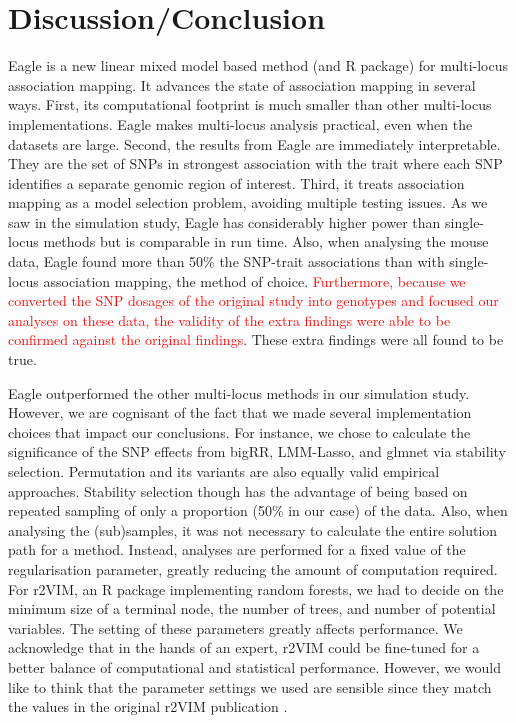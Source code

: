 \documentclass{bioinfo}
\begin{document}
 
\section{Discussion/Conclusion}
Eagle is a new linear mixed model based method (and R package) for multi-locus association mapping. It advances the state of association mapping in several ways. 
First, its computational footprint is much smaller than other multi-locus implementations. Eagle makes multi-locus analysis 
practical, even when the datasets are large. Second, the results from
 Eagle are immediately interpretable. They are the set of SNPs in strongest association with the trait where 
each SNP identifies a separate genomic region of interest. Third, it treats association mapping as a model selection problem, avoiding 
 multiple testing issues. 
 As we saw in the simulation study, Eagle has considerably higher power than single-locus methods but is comparable in run time.
Also, when analysing the mouse data, Eagle found more than 50\% the SNP-trait associations than 
with single-locus association mapping, the method of choice. \textcolor{red}{Furthermore, because we converted the SNP dosages of the 
original study into genotypes and focused our analyses on these data, the validity of the extra findings were able to  be confirmed 
against the original findings}. These extra findings were all found to be true. 

Eagle outperformed the other multi-locus methods in our simulation study. However, we are cognisant of the fact  that we made several implementation 
choices that impact our conclusions.  For instance, we chose to calculate the significance of the 
SNP effects from bigRR, LMM-Lasso, and glmnet via stability selection.  Permutation and its variants \citep{ browning2008presto,pahl2010permory} are also equally valid empirical approaches. Stability selection though has the advantage of being based on repeated sampling of only a proportion (50\% in our case) of the 
data. Also, when analysing the (sub)samples, it was not necessary to calculate the entire solution path for a method. 
 Instead,  analyses are 
performed for a fixed value of the regularisation parameter, greatly reducing the amount of computation required. For r2VIM, an R package 
implementing random forests, we had to decide on the  minimum size of a terminal node, the number of trees, and number of potential variables. 
The setting of these parameters greatly affects performance.  We  acknowledge that in the hands of an expert, 
r2VIM could be fine-tuned for a better balance of computational and statistical performance. 
However, we would like to think that the parameter settings we used are sensible 
since they match the values in the original r2VIM publication \citep{szymczak2016r2vim}.
\end{document}
